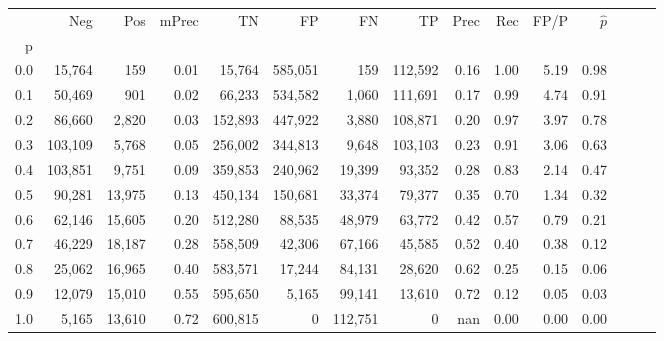 \begin{tabular}{rrrrrrrrrrrrrrr}
\toprule
{} &      Neg &     Pos & mPrec &       TN &       FP &       FN &       TP &  Prec &   Rec &  FP/P & $\hat{p}$ \\
p   &          &         &       &          &          &          &          &       &       &       &           \\
\midrule
0.0 &   15,764 &     159 &  0.01 &   15,764 &  585,051 &      159 &  112,592 &  0.16 &  1.00 &  5.19 &      0.98 \\
0.1 &   50,469 &     901 &  0.02 &   66,233 &  534,582 &    1,060 &  111,691 &  0.17 &  0.99 &  4.74 &      0.91 \\
0.2 &   86,660 &   2,820 &  0.03 &  152,893 &  447,922 &    3,880 &  108,871 &  0.20 &  0.97 &  3.97 &      0.78 \\
0.3 &  103,109 &   5,768 &  0.05 &  256,002 &  344,813 &    9,648 &  103,103 &  0.23 &  0.91 &  3.06 &      0.63 \\
0.4 &  103,851 &   9,751 &  0.09 &  359,853 &  240,962 &   19,399 &   93,352 &  0.28 &  0.83 &  2.14 &      0.47 \\
0.5 &   90,281 &  13,975 &  0.13 &  450,134 &  150,681 &   33,374 &   79,377 &  0.35 &  0.70 &  1.34 &      0.32 \\
0.6 &   62,146 &  15,605 &  0.20 &  512,280 &   88,535 &   48,979 &   63,772 &  0.42 &  0.57 &  0.79 &      0.21 \\
0.7 &   46,229 &  18,187 &  0.28 &  558,509 &   42,306 &   67,166 &   45,585 &  0.52 &  0.40 &  0.38 &      0.12 \\
0.8 &   25,062 &  16,965 &  0.40 &  583,571 &   17,244 &   84,131 &   28,620 &  0.62 &  0.25 &  0.15 &      0.06 \\
0.9 &   12,079 &  15,010 &  0.55 &  595,650 &    5,165 &   99,141 &   13,610 &  0.72 &  0.12 &  0.05 &      0.03 \\
1.0 &    5,165 &  13,610 &  0.72 &  600,815 &        0 &  112,751 &        0 &   nan &  0.00 &  0.00 &      0.00 \\
\bottomrule
\end{tabular}
